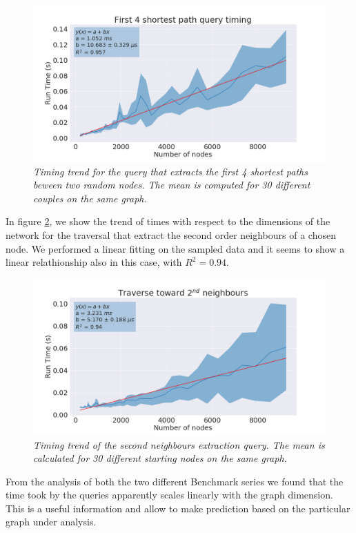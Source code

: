 \documentclass[11pt,twocolumn]{article}
\begin{document}
\begin{figure}[ht!]
  \includegraphics[width=\linewidth]{images/4_shortest_path_timing_readable.png}
  \caption{\small{\textit{Timing trend for the query that extracts the first 4 shortest paths beween two random nodes. The mean is computed for 30 different couples on the same graph.}}}
  \label{fig:sh_paths}
\end{figure}

In figure \ref{fig:tr_0_2}, we show the trend of times with respect to the dimensions of the network for the traversal that extract the second order neighbours of a chosen node. We performed a linear fitting on the sampled data and it seems to show a linear relathionship also in this case, with $R^2 = 0.94$.

\begin{figure}[ht!]
   \includegraphics[width=\linewidth]{images/traverse_0_2_readable.png}
   \caption{\small{\textit{Timing trend of the second neighbours extraction query. The mean is calculated for 30 different starting nodes on the same graph.}}}
   \label{fig:tr_0_2}
\end{figure}

From the analysis of both the two different Benchmark series we found that the time took by the queries apparently scales linearly with the graph dimension. This is a useful information and allow to make prediction based on the particular graph under analysis.
\end{document}
